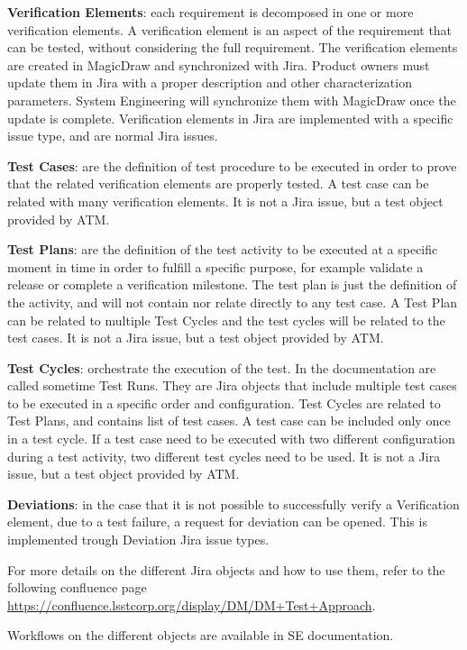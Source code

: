 {\bf Verification Elements}: each requirement is decomposed in one or more verification elements. A verification element is an aspect of the requirement that can be tested, without considering the full requirement.
The verification elements are created in MagicDraw and synchronized with Jira.
Product owners must update them in Jira with a proper description and other characterization parameters.
System Engineering will synchronize them with MagicDraw once the update is complete.
Verification elements in Jira are implemented with a specific issue type, and are normal Jira issues.

{\bf Test Cases}: are the definition of test procedure to be executed in order to prove that the related verification elements are properly tested. A test case can be related with many verification elements. It is not a Jira issue, but a test object provided by ATM.

{\bf Test Plans}: are the definition of the test activity to be executed  at a specific moment in time in order to fulfill a specific purpose, for example validate a release or complete a verification milestone.
The test plan is just the definition of the activity, and will not contain nor relate directly to any test case.
A Test Plan can be related to multiple Test Cycles and the test cycles will be related to the test cases.
It is not a Jira issue, but a test object provided by ATM.

{\bf Test Cycles}: orchestrate the execution of the test. In the documentation are called sometime Test Runs.
They are Jira objects that include multiple test cases to be executed in a specific order and configuration.
Test Cycles are related to Test Plans, and contains list of test cases.
A test case can be included only once in a test cycle. If a test case need to be executed with two different configuration during a test activity, two different test cycles need to be used.
It is not a Jira issue, but a test object provided by ATM.

{\bf Deviations}: in the case that it is not possible to successfully verify a Verification element, due to a test failure, a request for deviation can be opened.
This is implemented trough Deviation Jira issue types.

For more details on the different Jira objects and how to use them, refer to the following confluence page
\url{https://confluence.lsstcorp.org/display/DM/DM+Test+Approach}.

Workflows on the different objects are available in SE documentation.


